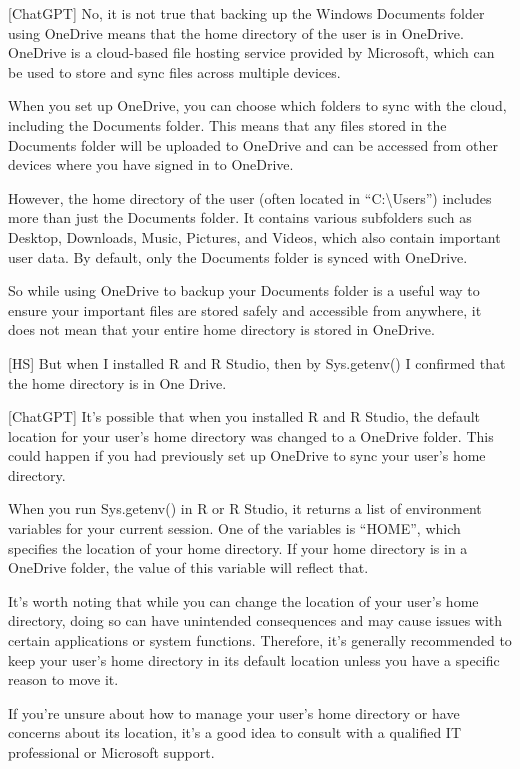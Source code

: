 \documentclass[
]{book}
\theoremstyle{definition}
\theoremstyle{definition}
\theoremstyle{definition}
\theoremstyle{definition}
\theoremstyle{remark}
\begin{document}
{[}ChatGPT{]} No, it is not true that backing up the Windows Documents folder using OneDrive means that the home directory of the user is in OneDrive. OneDrive is a cloud-based file hosting service provided by Microsoft, which can be used to store and sync files across multiple devices.

When you set up OneDrive, you can choose which folders to sync with the cloud, including the Documents folder. This means that any files stored in the Documents folder will be uploaded to OneDrive and can be accessed from other devices where you have signed in to OneDrive.

However, the home directory of the user (often located in ``C:\textbackslash Users'') includes more than just the Documents folder. It contains various subfolders such as Desktop, Downloads, Music, Pictures, and Videos, which also contain important user data. By default, only the Documents folder is synced with OneDrive.

So while using OneDrive to backup your Documents folder is a useful way to ensure your important files are stored safely and accessible from anywhere, it does not mean that your entire home directory is stored in OneDrive.

{[}HS{]} But when I installed R and R Studio, then by Sys.getenv() I confirmed that the home directory is in One Drive.

{[}ChatGPT{]} It's possible that when you installed R and R Studio, the default location for your user's home directory was changed to a OneDrive folder. This could happen if you had previously set up OneDrive to sync your user's home directory.

When you run Sys.getenv() in R or R Studio, it returns a list of environment variables for your current session. One of the variables is ``HOME'', which specifies the location of your home directory. If your home directory is in a OneDrive folder, the value of this variable will reflect that.

It's worth noting that while you can change the location of your user's home directory, doing so can have unintended consequences and may cause issues with certain applications or system functions. Therefore, it's generally recommended to keep your user's home directory in its default location unless you have a specific reason to move it.

If you're unsure about how to manage your user's home directory or have concerns about its location, it's a good idea to consult with a qualified IT professional or Microsoft support.
\end{document}
